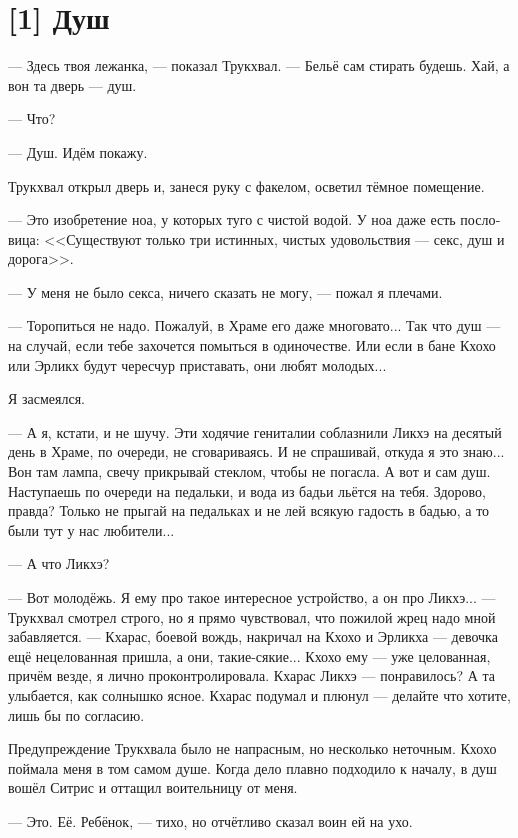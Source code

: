 \documentclass[a4paper,12pt,fleqn]{book}\usepackage{cooltooltips}\usepackage{polyglossia}\setdefaultlanguage[babelshorthands=true]{russian}\setotherlanguage{english}\defaultfontfeatures{Ligatures=TeX,Mapping=tex-text} \usepackage{xcolor}\definecolor{lightgray}{HTML}{bbbbbb}\color{lightgray}\newcommand{\ml}[3]{\textenglish{\textcolor{black}{#3}}}
\newcommand{\asterism}{\vspace{1em}{\centering\Large\bfseries$\ast~\ast~\ast$\par}\vspace{1em}}
\begin{document}
{\section{[1] Душ}

--- Здесь твоя лежанка, --- показал Трукхвал.
--- Бельё сам стирать будешь.
Хай, а вон та дверь --- душ.

--- Что?

--- Душ.
Идём покажу.

Трукхвал открыл дверь и, занеся руку с факелом, осветил тёмное помещение.

--- Это изобретение ноа, у которых туго с чистой водой.
У ноа даже есть пословица: <<Существуют только три истинных, чистых удовольствия --- секс, душ и дорога>>.

--- У меня не было секса, ничего сказать не могу, --- пожал я плечами.

--- Торопиться не надо.
Пожалуй, в Храме его даже многовато...
Так что душ --- на случай, если тебе захочется помыться в одиночестве.
Или если в бане Кхохо или Эрликх будут чересчур приставать, они любят молодых...

Я засмеялся.

--- А я, кстати, и не шучу.
Эти ходячие гениталии соблазнили Ликхэ на десятый день в Храме, по очереди, не сговариваясь.
И не спрашивай, откуда я это знаю...
Вон там лампа, свечу прикрывай стеклом, чтобы не погасла.
А вот и сам душ.
Наступаешь по очереди на педальки, и вода из бадьи льётся на тебя.
Здорово, правда?
Только не прыгай на педальках и не лей всякую гадость в бадью, а то были тут у нас любители...

--- А что Ликхэ?

--- Вот молодёжь.
Я ему про такое интересное устройство, а он про Ликхэ... --- Трукхвал смотрел строго, но я прямо чувствовал, что пожилой жрец надо мной забавляется.
--- Кхарас, боевой вождь, накричал на Кхохо и Эрликха --- девочка ещё нецелованная пришла, а они, такие-сякие...
Кхохо ему --- уже целованная, причём везде, я лично проконтролировала.
Кхарас Ликхэ --- понравилось?
А та улыбается, как солнышко ясное.
Кхарас подумал и плюнул --- делайте что хотите, лишь бы по согласию.

\asterism

Предупреждение Трукхвала было не напрасным, но несколько неточным.
Кхохо поймала меня в том самом душе.
Когда дело плавно подходило к началу, в душ вошёл Ситрис и оттащил воительницу от меня.

--- Это. Её. Ребёнок, --- тихо, но отчётливо сказал воин ей на ухо.

}
\end{document}
